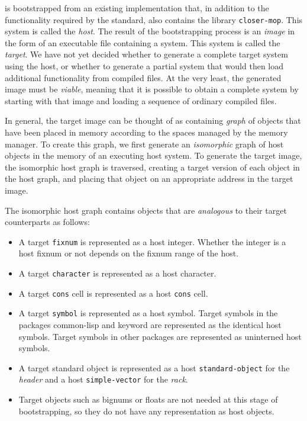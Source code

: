 \sysname{} is bootstrapped from an existing \commonlisp{}
implementation that, in addition to the functionality required by the
standard, also contains the library \texttt{closer-mop}.  This
\commonlisp{} system is called the \emph{host}.  The result of the
bootstrapping process is an \emph{image} in the form of an executable
file containing a \sysname{} system.  This system is called the
\emph{target}.  We have not yet decided whether to generate a complete
target system using the host, or whether to generate a partial system
that would then load additional functionality from compiled files.  At
the very least, the generated image must be \emph{viable}, meaning
that it is possible to obtain a complete \commonlisp{} system by
starting with that image and loading a sequence of ordinary compiled
files.

In general, the target image can be thought of as containing
\emph{graph} of \commonlisp{} objects that have been placed in memory
according to the spaces managed by the memory manager.  To create this
graph, we first generate an \emph{isomorphic} graph of host objects in
the memory of an executing host system.  To generate the target image,
the isomorphic host graph is traversed, creating a target version of
each object in the host graph, and placing that object on an
appropriate address in the target image.

The isomorphic host graph contains objects that are \emph{analogous}
to their target counterparts as follows:

\begin{itemize}
\item A target \texttt{fixnum} is represented as a host integer.
  Whether the integer is a host fixnum or not depends on the fixnum
  range of the host.
\item A target \texttt{character} is represented as a host character.
\item A target \texttt{cons} cell is represented as a host
  \texttt{cons} cell.
\item A target \texttt{symbol} is represented as a host symbol.
  Target symbols in the packages {\sc common-lisp} and {\sc keyword}
  are represented as the identical host symbols.  Target symbols in
  other packages are represented as uninterned host symbols.
\item A target standard object is represented as a host
  \texttt{standard-object} for the \emph{header} and a host
  \texttt{simple-vector} for the \emph{rack}.
\item Target objects such as bignums or floats are not needed at this
  stage of bootstrapping, so they do not have any representation as
  host objects.
\end{itemize}

